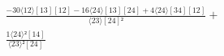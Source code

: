 \documentclass[varwidth, border=5pt]{standalone}
\begin{document}
\begin{my}
$\begin{gathered}
\scriptscriptstyle\frac{-30⟨12⟩[13][12]-16⟨24⟩[13][24]+4⟨24⟩[34][12]}{⟨23⟩[24]²} +\\
\scriptscriptstyle\frac{1⟨24⟩²[14]}{⟨23⟩²[24]} \phantom{+}
\end{gathered}$
\end{my}
\end{document}
